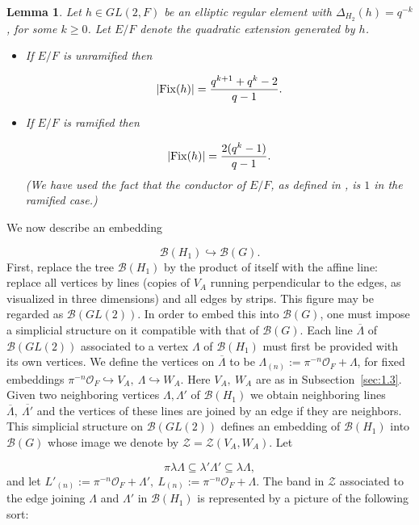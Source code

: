 \documentclass[12pt,letterpaper]{amsart}
\numberwithin{equation}{section}
\newtheorem{lemma}[theorem]{Lemma}
\theoremstyle{definition}
\theoremstyle{plain}
\providecommand{\cal}{\mathcal}
\def\bbb{{\cal B}}
\def\zz{{\cal Z}}
\def\off{{\cal O}_F}
\def\bbH1{{\cal B}(H_1)}
\def\sne{\subseteq}
\begin{document}
\begin{lemma}
\label{lemma:4.5} 
Let $h\in GL(2,F)$ be an elliptic regular element
with $\Delta_{H_2} (h)=q^{-k}$, for some $k\geq 0$. Let $E/F$ denote the
quadratic extension generated by $h$. 

\begin{itemize}
\item 
If $E/F$ is unramified then

\[
|{\rm Fix}(h)|={{q^{k+1}+q^k-2}\over{q-1}}.
\]        
\item 
If $E/F$ is ramified then

\[
|{\rm Fix}(h)|={2(q^k-1)\over{q-1}}.
\]        
(We have used the fact that the conductor of $E/F$, as defined in \cite{Bl85},
is $1$ in the ramified case.)
\end{itemize}
\end{lemma}

We now describe an embedding

\[
\bbb (H_1) \hookrightarrow \bbb (G).
\]
First, replace the tree $\bbb (H_1)$ by the product of itself with 
the affine line:
replace all vertices by lines (copies of $V_A$ running perpendicular to the 
edges, as visualized in three dimensions) and all edges by strips. 
This figure may be regarded as $\bbb (GL(2))$. 
In order to embed this into
$\bbb (G)$, one must impose a simplicial structure on it compatible with that
of $\bbb (G)$. 
Each line $\overline{\Lambda}$ of $\bbb (GL(2))$ associated to a
vertex $\Lambda$ of $\bbb (H_1)$ must first be provided with its 
own vertices. 
We define the vertices on $\overline{\Lambda}$ to be 
$\Lambda_{(n)} :=\pi^{-n}\off + \Lambda$,
for fixed embeddings
$\pi^{-n}\off \hookrightarrow V_A,\ \Lambda\hookrightarrow W_A$. 
Here $V_A, \ W_A$ are as in Subsection~\ref{sec:1.3}. Given two neighboring
vertices $\Lambda , \Lambda '$ of $\bbb (H_1)$ we obtain neighboring lines
$\overline{\Lambda},\ \overline{\Lambda '}$ and the vertices of these lines 
are joined by an edge if they are neighbors. 
This simplicial structure 
on $\bbb (GL(2))$ defines an embedding of
$\bbb (H_1)$ into $\bbb (G)$ whose image we denote by $\zz = \zz (V_A,W_A)$. 
Let

\[
\pi\lambda \Lambda \sne \lambda ' \Lambda ' 
\sne \lambda \Lambda ,
\]
and let $L'_{(n)} := \pi^{-n}\off + \Lambda ', 
\ L_{(n)}:=\pi^{-n}\off + \Lambda$. The band in $\zz$ associated to the edge 
joining $\Lambda $ and $\Lambda '$ in $\bbH1$ is represented by a 
picture of the following sort:
\end{document}
